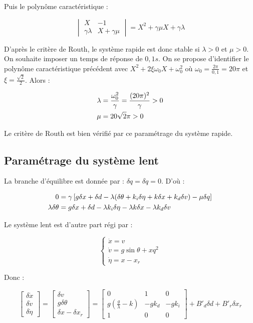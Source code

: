 \documentclass[10pt]{article}
\begin{document}
\noindent Puis le polynôme caractéristique :

\[
	\begin{vmatrix}
		X & -1 \\
		\gamma \lambda & X + \gamma \mu
	\end{vmatrix}
	= X^2 + \gamma \mu X + \gamma \lambda
\]

\noindent D'après le critère de Routh, le système rapide est donc stable si $\lambda > 0$ et $\mu > 0$. On souhaite
imposer un temps de réponse de $0,1 s$. On se propose d'identifier le polynôme caractéristique précédent avec
$X^2 + 2 \xi \omega_0 X + \omega_0^2$ où $\omega_0 = \frac{2 \pi}{0,1} = 20 \pi$ et $\xi = \frac{\sqrt 2}{2}$.
Alors :

\begin{align}
	\lambda &= \frac{\omega_0^2}{\gamma} = \frac{(20 \pi)^2}{\gamma} > 0 \notag \\
	\mu &= 20 \sqrt 2	 \pi > 0 \notag
\end{align}

\noindent Le critère de Routh est bien vérifié par ce paramétrage du système rapide.

\subsection*{Paramétrage du système lent}

\noindent La branche d'équilibre est donnée par : $\delta q= \delta \dot q = 0$. D'où :

\begin{align}
	0 &= \gamma \left[ g \delta x + \delta d - \lambda ( \delta \theta + k_i \delta \eta + k \delta x + k_d \delta v )
	- \mu \delta q \right] \notag \\
	\lambda \delta \theta &= g \delta x + \delta d - \lambda k_i \delta \eta - \lambda k \delta x - \lambda k_d \delta v \notag 
\end{align}

\noindent Le système lent est d'autre part régi par :

\[
	 \begin{cases}
	 	\dot x = v \\
		\dot v = g \sin \theta + x q^2 \\
		\dot \eta = x - x_r
	\end{cases}
\]

\noindent Donc :

\[
	\begin{bmatrix}
		\delta \dot x \\
		\delta \dot v \\
		\delta \dot \eta
	\end{bmatrix}
	= \begin{bmatrix}
		\delta v \\
		g \delta \theta \\
		\delta x - \delta x_r
	\end{bmatrix}
	= \begin{bmatrix}
		0 & 1 & 0 \\
		g ( \frac{g}{\lambda} - k ) & - g k_d & - g k_i \\
		1 & 0 & 0
	\end{bmatrix} +
	B'_d \delta d + B'_r \delta x_r
\]
\end{document}
